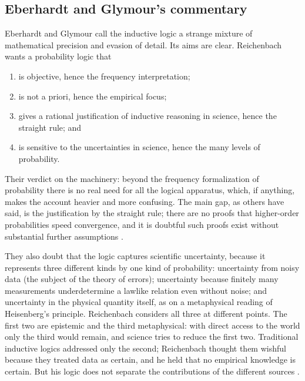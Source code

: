 \subsection{Eberhardt and Glymour's commentary}
\label{sec:p15-w02b-p15-030-eg-commentary}

Eberhardt and Glymour call the inductive logic a strange mixture of mathematical
precision and evasion of detail. Its aims are clear. Reichenbach wants a
probability logic that
\begin{enumerate}[label=(\alph*)]
\item is objective, hence the frequency interpretation;
\item is not a priori, hence the empirical focus;
\item gives a rational justification of inductive reasoning in science,
  hence the straight rule; and
\item is sensitive to the uncertainties in science, hence the many levels
  of probability.
\end{enumerate}
\cite[pp.~384--385]{EberhardtGlymour2011ReichenbachReading}

Their verdict on the machinery: beyond the frequency formalization of
probability there is no real need for all the logical apparatus, which,
if anything, makes the account heavier and more confusing. The main gap,
as others have said, is the justification by the straight rule; there
are no proofs that higher-order probabilities speed convergence, and it
is doubtful such proofs exist without substantial further assumptions
\cite[p.~385]{EberhardtGlymour2011ReichenbachReading}.

They also doubt that the logic captures scientific uncertainty, because
it represents three different kinds by one kind of probability:
uncertainty from noisy data (the subject of the theory of errors);
uncertainty because finitely many measurements underdetermine a lawlike
relation even without noise; and uncertainty in the physical quantity
itself, as on a metaphysical reading of Heisenberg's principle.
Reichenbach considers all three at different points. The first two are
epistemic and the third metaphysical: with direct access to the world
only the third would remain, and science tries to reduce the first two.
Traditional inductive logics addressed only the second; Reichenbach
thought them wishful because they treated data as certain, and he held
that no empirical knowledge is certain. But his logic does not separate
the contributions of the different sources
\cite[p.~385]{EberhardtGlymour2011ReichenbachReading}.

